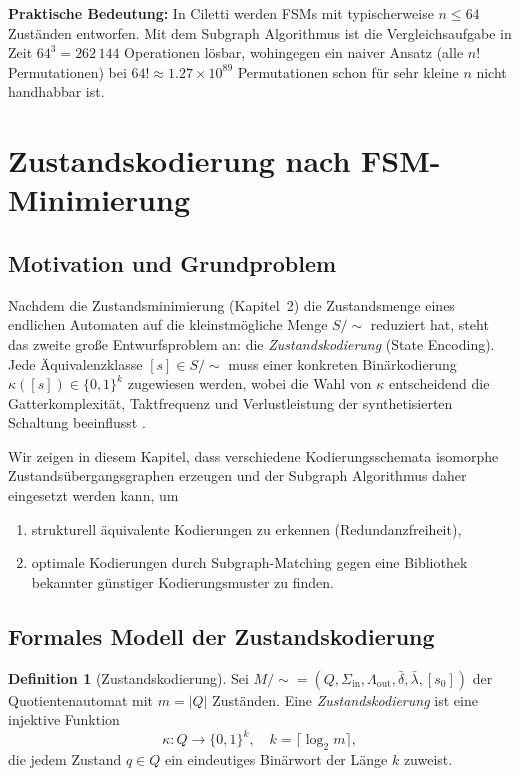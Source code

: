 ﻿\documentclass[a4paper,12pt]{article}
\theoremstyle{definition}
\newtheorem{definition}{Definition}
\begin{document}
\textbf{Praktische Bedeutung:} In Ciletti \cite[Kap.~3]{ciletti2011} werden FSMs mit
typischerweise $n \leq 64$ Zuständen entworfen. Mit dem Subgraph Algorithmus ist die
Vergleichsaufgabe in Zeit $64^3 = 262\,144$ Operationen lösbar, wohingegen ein naiver
Ansatz (alle $n!$ Permutationen) bei $64! \approx 1.27 \times 10^{89}$ Permutationen
schon für sehr kleine $n$ nicht handhabbar ist.

\section{Zustandskodierung nach FSM-Minimierung}

\subsection{Motivation und Grundproblem}

Nachdem die Zustandsminimierung (Kapitel~2) die Zustandsmenge eines endlichen Automaten
auf die kleinstmögliche Menge $S/{\sim}$ reduziert hat, steht das zweite große
Entwurfsproblem an: die \emph{Zustandskodierung} (State Encoding). Jede Äquivalenzklasse
$[s] \in S/{\sim}$ muss einer konkreten Binärkodierung $\kappa([s]) \in \{0,1\}^k$
zugewiesen werden, wobei die Wahl von $\kappa$ entscheidend die Gatterkomplexität,
Taktfrequenz und Verlustleistung der synthetisierten Schaltung beeinflusst
\cite[Kap.~3, S.~96--107]{ciletti2011}.

Wir zeigen in diesem Kapitel, dass verschiedene Kodierungsschemata isomorphe
Zustandsübergangsgraphen erzeugen und der Subgraph Algorithmus daher eingesetzt werden
kann, um
\begin{enumerate}
  \item strukturell äquivalente Kodierungen zu erkennen (Redundanzfreiheit),
  \item optimale Kodierungen durch Subgraph-Matching gegen eine Bibliothek bekannter
        günstiger Kodierungsmuster zu finden.
\end{enumerate}

\subsection{Formales Modell der Zustandskodierung}

\begin{definition}[Zustandskodierung]\label{def:zkodierung}
  Sei $M/{\sim} = (Q, \Sigma_{\text{in}}, \Lambda_{\text{out}}, \bar\delta, \bar\lambda, [s_0])$
  der Quotientenautomat mit $m = |Q|$ Zuständen. Eine \emph{Zustandskodierung} ist eine
  injektive Funktion
  \[
    \kappa: Q \to \{0,1\}^k, \quad k = \lceil \log_2 m \rceil,
  \]
  die jedem Zustand $q \in Q$ ein eindeutiges Binärwort der Länge $k$ zuweist.
\end{definition}
\end{document}
